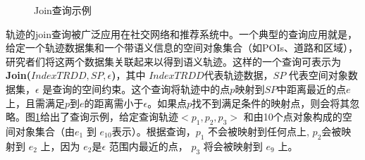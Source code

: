  \begin{figure}[t]
	\centering
	\caption{Join查询示例}
	\label{fig:joinprepare}
	\vspace{-0.5cm}
\end{figure}
轨迹的join查询被广泛应用在社交网络和推荐系统中。一个典型的查询应用就是，给定一个轨迹数据集和一个带语义信息的空间对象集合（如POIs、道路和区域），研究者们将这两个数据集关联起来以得到语义轨迹。这样的一个查询可表示为\textbf{Join($IndexTRDD, SP,\epsilon$)}，其中 $IndexTRDD$代表轨迹数据，$SP$ 代表空间对象数据集，$\epsilon$ 是查询的空间约束。这个查询将轨迹中的点$p$映射到$SP$中距离最近的点$e$上，且需满足$p$到$e$的距离需小于$\epsilon$。如果点$p$找不到满足条件的映射点，则会将其忽略。图\ref{fig:joinprepare}给出了查询示例，给定查询轨迹$< p_{1}, p_{2}, p_{3}>$ 和由10个点对象构成的空间对象集合（由$e_{1} $ 到 $e_{10}$表示）。根据查询，$p_{1}$ 不会被映射到任何点上, $p_{2}$会被映射到 $e_{2}$ 上，因为 $e_{2}$是$\epsilon$ 范围内最近的点，  $p_{3}$ 将会被映射到 $e_{9}$ 上。

